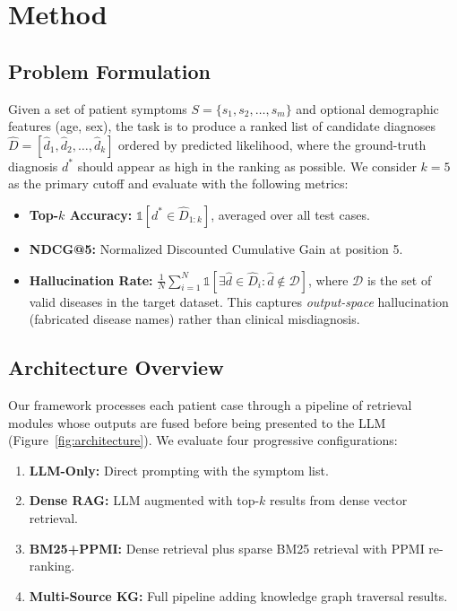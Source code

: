 \documentclass[runningheads]{llncs}
\begin{document}
\section{Method}
\label{sec:method}

\subsection{Problem Formulation}

Given a set of patient symptoms $S = \{s_1, s_2, \ldots, s_m\}$ and optional demographic features (age, sex), the task is to produce a ranked list of candidate diagnoses $\hat{D} = [\hat{d}_1, \hat{d}_2, \ldots, \hat{d}_k]$ ordered by predicted likelihood, where the ground-truth diagnosis $d^*$ should appear as high in the ranking as possible. We consider $k{=}5$ as the primary cutoff and evaluate with the following metrics:

\begin{itemize}
    \item \textbf{Top-$k$ Accuracy:} $\mathbb{1}[d^* \in \hat{D}_{1:k}]$, averaged over all test cases.
    \item \textbf{NDCG@5:} Normalized Discounted Cumulative Gain at position 5.
    \item \textbf{Hallucination Rate:} $\frac{1}{N}\sum_{i=1}^{N} \mathbb{1}[\exists \hat{d} \in \hat{D}_i : \hat{d} \notin \mathcal{D}]$, where $\mathcal{D}$ is the set of valid diseases in the target dataset. This captures \emph{output-space} hallucination (fabricated disease names) rather than clinical misdiagnosis.
\end{itemize}

\subsection{Architecture Overview}

Our framework processes each patient case through a pipeline of retrieval modules whose outputs are fused before being presented to the LLM (Figure~\ref{fig:architecture}). We evaluate four progressive configurations:

\begin{enumerate}
    \item \textbf{LLM-Only:} Direct prompting with the symptom list.
    \item \textbf{Dense RAG:} LLM augmented with top-$k$ results from dense vector retrieval.
    \item \textbf{BM25+PPMI:} Dense retrieval plus sparse BM25 retrieval with PPMI re-ranking.
    \item \textbf{Multi-Source KG:} Full pipeline adding knowledge graph traversal results.
\end{enumerate}
\end{document}
